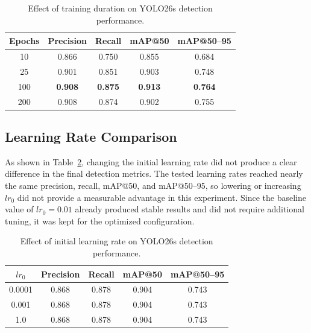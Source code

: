 \documentclass[10pt,twocolumn,letterpaper]{article}
\begin{document}
\begin{table}[!htbp]
  \centering
  \small
  \begin{tabular}{@{}ccccc@{}}
    \toprule
    Epochs & Precision & Recall & mAP@50 & mAP@50--95 \\
    \midrule
    10  & 0.866 & 0.750 & 0.855 & 0.684 \\
    25  & 0.901 & 0.851 & 0.903 & 0.748 \\
    100 & \textbf{0.908} & \textbf{0.875} & \textbf{0.913} & \textbf{0.764} \\
    200 & 0.908 & 0.874 & 0.902 & 0.755 \\
    \bottomrule
  \end{tabular}
  \caption{Effect of training duration on YOLO26s detection performance.}
  \label{tab:epoch_result}
\end{table}

\subsection{Learning Rate Comparison}

As shown in Table~\ref{tab:lr_result}, changing the initial learning rate did not produce a clear difference in the final detection metrics. The tested learning rates reached nearly the same precision, recall, mAP@50, and mAP@50--95, so lowering or increasing $lr_0$ did not provide a measurable advantage in this experiment. Since the baseline value of $lr_0=0.01$ already produced stable results and did not require additional tuning, it was kept for the optimized configuration.

\begin{table}[!htbp]
  \centering
  \small
  \begin{tabular}{@{}ccccc@{}}
    \toprule
    $lr_0$ & Precision & Recall & mAP@50 & mAP@50--95 \\
    \midrule
    0.0001 & 0.868 & 0.878 & 0.904 & 0.743 \\
    0.001  & 0.868 & 0.878 & 0.904 & 0.743 \\
    1.0    & 0.868 & 0.878 & 0.904 & 0.743 \\
    \bottomrule
  \end{tabular}
  \caption{Effect of initial learning rate on YOLO26s detection performance.}
  \label{tab:lr_result}
\end{table}

\end{document}
